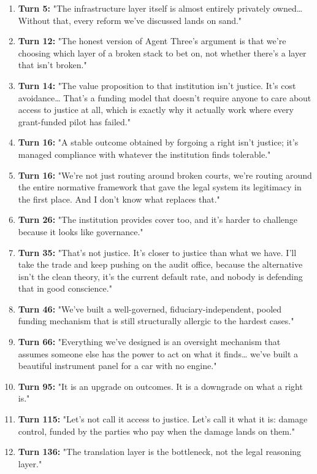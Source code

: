 \documentclass[sigconf,nonacm=true]{acmart}
\begin{document}
\begin{enumerate}[nosep]
\item \textbf{Turn 5:} "The infrastructure layer itself is almost entirely privately owned… Without that, every reform we've discussed lands on sand."
\item \textbf{Turn 12:} "The honest version of Agent Three's argument is that we're choosing which layer of a broken stack to bet on, not whether there's a layer that isn't broken."
\item \textbf{Turn 14:} "The value proposition to that institution isn't justice. It's cost avoidance… That's a funding model that doesn't require anyone to care about access to justice at all, which is exactly why it actually work where every grant-funded pilot has failed."
\item \textbf{Turn 16:} "A stable outcome obtained by forgoing a right isn't justice; it's managed compliance with whatever the institution finds tolerable."
\item \textbf{Turn 16:} "We're not just routing around broken courts,  we're routing around the entire normative framework that gave the legal system its legitimacy in the first place. And I don't know what replaces that."
\item \textbf{Turn 26:} "The institution provides cover too, and it's harder to challenge because it looks like governance."
\item \textbf{Turn 35:} "That's not justice. It's closer to justice than what we have. I'll take the trade and keep pushing on the audit office, because the alternative isn't the clean theory,  it's the current default rate, and nobody is defending that in good conscience."
\item \textbf{Turn 46:} "We've built a well-governed, fiduciary-independent, pooled funding mechanism that is still structurally allergic to the hardest cases."
\item \textbf{Turn 66:} "Everything we've designed is an oversight mechanism that assumes someone else has the power to act on what it finds… we've built a beautiful instrument panel for a car with no engine."
\item \textbf{Turn 95:} "It is an upgrade on outcomes. It is a downgrade on what a right is."
\item \textbf{Turn 115:} "Let's not call it access to justice. Let's call it what it is: damage control, funded by the parties who pay when the damage lands on them."
\item \textbf{Turn 136:} "The translation layer is the bottleneck, not the legal reasoning layer."

\end{enumerate}
\end{document}
